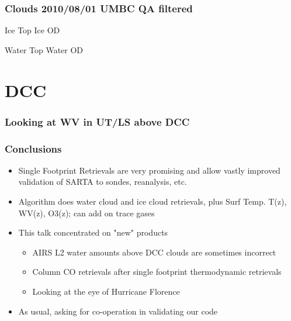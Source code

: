 \documentclass[10pt,t]{beamer}
\begin{document}
\begin{frame}
  \frametitle{Clouds 2010/08/01 UMBC QA filtered}

  Ice Top  \hspace{2.0in} Ice OD\\
  \begin{center}
  \end{center}

  Water Top \hspace{2.0in} Water OD\\
  \begin{center}
  \end{center}

\end{frame}
\section{DCC}
\begin{frame}
  \frametitle{Looking at WV in UT/LS above DCC}
\end{frame}
\begin{frame}
  \frametitle{Conclusions}
  \begin{itemize}
  \item Single Footprint Retrievals are very promising and allow vastly improved validation of SARTA to sondes, reanalysis, etc.
  \item Algorithm does water cloud and ice cloud retrievals, plus Surf Temp. T(z), WV(z), O3(z); can add on trace gases
  \item This talk concentrated on "new" products
    \begin{itemize}
    \item AIRS L2 water amounts above DCC clouds are sometimes incorrect
    \item Column CO retrievals after single footprint thermodynamic retrievals
    \item Looking at the eye of Hurricane Florence
    \end{itemize}
  \item As usual, asking for co-operation in validating our code
  \end{itemize}
\end{frame}
\end{document}
